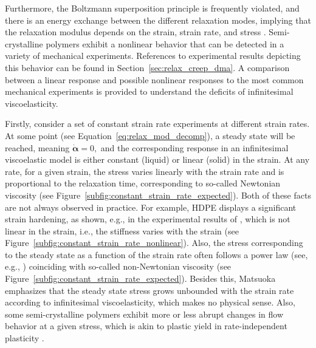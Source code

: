 Furthermore, the Boltzmann superposition principle is frequently violated, and there is an energy exchange between the different relaxation modes, implying that the relaxation modulus depends on the strain, strain rate, and stress \citep{malkinRheologyConceptsMethods2017}.
Semi-crystalline polymers exhibit a nonlinear behavior that can be detected in a variety of mechanical experiments.
References to experimental results depicting this behavior can be found in Section~\ref{sec:relax_creep_dma}.
A comparison between a linear response and possible nonlinear responses to the most common mechanical experiments is provided to understand the deficits of infinitesimal viscoelasticity.

Firstly, consider a set of constant strain rate experiments at different strain rates.
At some point (see Equation~\eqref{eq:relax_mod_decomp}), a steady state will be reached, meaning $\dot {\bm\alpha} = 0,$ and the corresponding response in an infinitesimal viscoelastic model is either constant (liquid) or linear (solid) in the strain.
At any rate, for a given strain, the stress varies linearly with the strain rate and is proportional to the relaxation time, corresponding to so-called Newtonian viscosity \citep{matsuokaThermodynamicTheoryViscoelasticity1996} (see Figure~\ref{subfig:constant_strain_rate_expected}).
Both of these facts are not always observed in practice.
For example, HDPE displays a significant strain hardening, as shown, e.g., in the experimental results of \cite{gsellYieldTransientEffects1981}, which is not linear in the strain, i.e., the stiffness varies with the strain (see Figure~\ref{subfig:constant_strain_rate_nonlinear}).
Also, the stress corresponding to the steady state as a function of the strain rate often follows a power law (see, e.g.,  \cite{gsellDeterminationPlasticBehaviour1979}) coinciding with so-called non-Newtonian viscosity (see Figure~\ref{subfig:constant_strain_rate_expected}).
Besides this, Matsuoka \citep{matsuokaThermodynamicTheoryViscoelasticity1996} emphasizes that the steady state stress grows unbounded with the strain rate according to infinitesimal viscoelasticity, which makes no physical sense.
Also, some semi-crystalline polymers exhibit more or less abrupt changes in flow behavior at a given stress, which is akin to plastic yield in rate-independent plasticity \citep{bergstromMechanicsSolidPolymers2015}.

